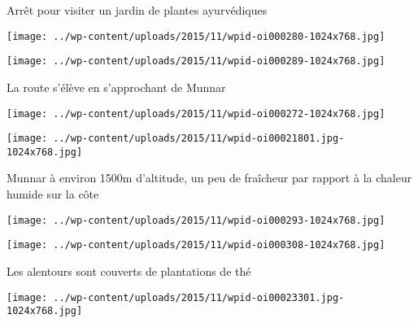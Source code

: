  

 Arrêt pour visiter un jardin de plantes ayurvédiques 

 

\begin{center} \texttt{[image: ../wp-content/uploads/2015/11/wpid-oi000280-1024x768.jpg]} \end{center}

 

 

\begin{center} \texttt{[image: ../wp-content/uploads/2015/11/wpid-oi000289-1024x768.jpg]} \end{center}

 

 La route s'élève en s'approchant de Munnar 

 

\begin{center} \texttt{[image: ../wp-content/uploads/2015/11/wpid-oi000272-1024x768.jpg]} \end{center}

 

 

\begin{center} \texttt{[image: ../wp-content/uploads/2015/11/wpid-oi00021801.jpg-1024x768.jpg]} \end{center}

 

 Munnar à environ 1500m d'altitude, un peu de fraîcheur par rapport à la chaleur humide sur la côte 

 

\begin{center} \texttt{[image: ../wp-content/uploads/2015/11/wpid-oi000293-1024x768.jpg]} \end{center}

 

 

\begin{center} \texttt{[image: ../wp-content/uploads/2015/11/wpid-oi000308-1024x768.jpg]} \end{center}

 

 Les alentours sont couverts de plantations de thé 

 

\begin{center} \texttt{[image: ../wp-content/uploads/2015/11/wpid-oi00023301.jpg-1024x768.jpg]} \end{center}

